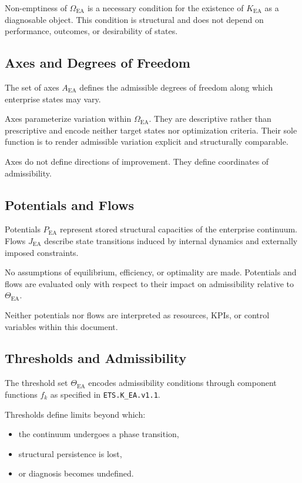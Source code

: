 Non-emptiness of $\Omega_{\mathrm{EA}}$ is a necessary condition for the
existence of $K_{\mathrm{EA}}$ as a diagnosable object.
This condition is structural and does not depend on performance,
outcomes, or desirability of states.

\subsection{Axes and Degrees of Freedom}

The set of axes $A_{\mathrm{EA}}$ defines the admissible degrees of
freedom along which enterprise states may vary.

Axes parameterize variation within $\Omega_{\mathrm{EA}}$.
They are descriptive rather than prescriptive and encode neither target
states nor optimization criteria.
Their sole function is to render admissible variation explicit and
structurally comparable.

Axes do not define directions of improvement.
They define coordinates of admissibility.

\subsection{Potentials and Flows}

Potentials $P_{\mathrm{EA}}$ represent stored structural capacities of
the enterprise continuum.
Flows $J_{\mathrm{EA}}$ describe state transitions induced by internal
dynamics and externally imposed constraints.

No assumptions of equilibrium, efficiency, or optimality are made.
Potentials and flows are evaluated only with respect to their impact on
admissibility relative to $\Theta_{\mathrm{EA}}$.

Neither potentials nor flows are interpreted as resources, KPIs, or
control variables within this document.

\subsection{Thresholds and Admissibility}

The threshold set $\Theta_{\mathrm{EA}}$ encodes admissibility
conditions through component functions $f_k$ as specified in
\texttt{ETS.K\_EA.v1.1}.

Thresholds define limits beyond which:
\begin{itemize}
  \item the continuum undergoes a phase transition,
  \item structural persistence is lost,
  \item or diagnosis becomes undefined.
\end{itemize}

